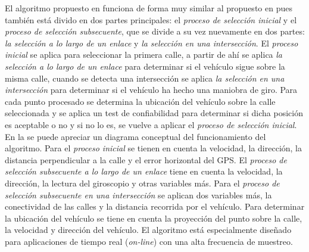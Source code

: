 El algoritmo propuesto en \cite{quddus2006high} funciona de forma muy similar al propuesto en \cite{ochieng2009map} pues también está divido en dos partes principales: el \emph{proceso de selección inicial} y el \emph{proceso de selección subsecuente}, que se divide a su vez nuevamente en dos partes: \emph{la selección a lo largo de un enlace} y  \emph{la selección en una intersección}. El \emph{proceso inicial} se aplica para seleccionar la primera calle, a partir de ahí se aplica \emph{la selección a lo largo de un enlace} para determinar si el vehículo sigue sobre la misma calle, cuando se detecta una intersección se aplica \emph{la selección en una intersección} para determinar si el vehículo ha hecho una maniobra de giro. Para cada punto procesado se determina la ubicación del vehículo sobre la calle seleccionada y se aplica un test de confiabilidad para determinar si dicha posición es aceptable o no y si no lo es, se vuelve a aplicar el \emph{proceso de selección inicial}. En la  se puede apreciar un diagrama conceptual del funcionamiento del algoritmo. Para el \emph{proceso inicial} se tienen en cuenta la velocidad, la dirección, la distancia perpendicular a la calle y el error horizontal del GPS. El \emph{proceso de selección subsecuente a lo largo de un enlace} tiene en cuenta la velocidad, la dirección, la lectura del giroscopio y otras variables más. Para el \emph{proceso de selección subsecuente en una intersección} se aplican dos variables más, la conectividad de las calles y la distancia recorrida por el vehículo. Para determinar la ubicación del vehículo se tiene en cuenta la proyección del punto sobre la calle, la velocidad y dirección del vehículo. El algoritmo está especialmente diseñado para aplicaciones de tiempo real (\emph{on-line}) con una alta frecuencia de muestreo. 

